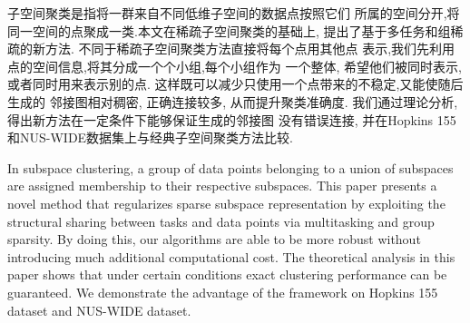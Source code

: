 \begin{cnabstract}
  子空间聚类是指将一群来自不同低维子空间的数据点按照它们
  所属的空间分开,将同一空间的点聚成一类.本文在稀疏子空间聚类的基础上,
  提出了基于多任务和组稀疏的新方法.
  不同于稀疏子空间聚类方法直接将每个点用其他点
  表示,我们先利用点的空间信息,将其分成一个个小组,每个小组作为
  一个整体, 希望他们被同时表示,或者同时用来表示别的点.
  这样既可以减少只使用一个点带来的不稳定,又能使随后生成的
  邻接图相对稠密, 正确连接较多, 从而提升聚类准确度.
  我们通过理论分析,得出新方法在一定条件下能够保证生成的邻接图
  没有错误连接, 并在Hopkins 155和NUS-WIDE数据集上与经典子空间聚类方法比较.
  
\end{cnabstract}

\begin{enabstract}
  In subspace clustering, a group of data points belonging
  to a union of subspaces are assigned membership to their
  respective subspaces. This paper presents a novel method
  that regularizes sparse subspace representation by exploiting the
  structural sharing between tasks and data points via multitasking
  and group sparsity. By doing this, our algorithms are able to be more robust
  without introducing much additional computational cost. The
  theoretical analysis in this paper shows that under certain conditions
  exact clustering performance can be guaranteed. We demonstrate
  the advantage of the framework on Hopkins 155 dataset and NUS-WIDE dataset.

\end{enabstract}
